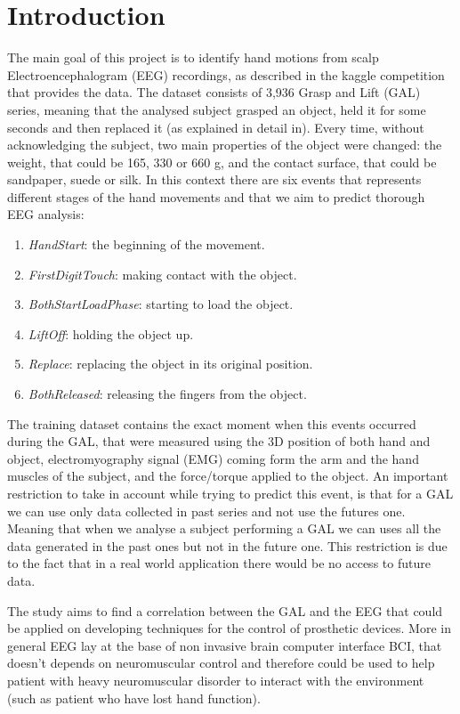 \documentclass[final,leqno,onefignum,onetabnum]{siamltexmm}
\begin{document}
  \section{Introduction}
  The main goal of this project is to identify hand motions from scalp Electroencephalogram (EEG) recordings, as described in the kaggle competition that provides the data\cite{kaggle}.  The dataset consists of 3,936 Grasp and Lift (GAL) series, meaning that the analysed subject grasped an object, held it for some seconds and then replaced it (as explained in detail in\cite{experiment}). Every time, without acknowledging the subject,  two main properties of the object were changed: the  weight, that could be 165, 330 or 660 g, and the contact surface, that could be sandpaper, suede or silk. In this context there are six events that represents different stages of the hand movements and that we aim to predict thorough EEG analysis: 
  \begin{enumerate} 
    \item \textit{HandStart}: the beginning of the movement.
    \item \textit{FirstDigitTouch}: making contact with the object.  
    \item \textit{BothStartLoadPhase}: starting to load the object. 
    \item \textit{LiftOff}: holding the object up.
    \item \textit{Replace}: replacing the object in its original position.
    \item \textit{BothReleased}: releasing the fingers from the object. 
  \end{enumerate}
  The training dataset contains the exact moment when this events occurred during the GAL, that were measured using the 3D position of both hand and object, electromyography signal (EMG) coming form the arm and the hand muscles of the subject, and the force/torque applied to the object. An important restriction to take in account while trying to predict this event, is that for a GAL we can use only data collected in past series and not use the futures one. Meaning that when we analyse a subject performing  a GAL we can uses all the data generated in the past ones but not in the future one. This restriction is due to the fact that in a real world application there would be no access to future data.


  The study aims to find a correlation between the GAL and the EEG  that could be applied on developing techniques for the control of prosthetic devices. More in general EEG lay at the base of non invasive brain computer interface BCI\cite{BCI}, that doesn't depends on neuromuscular control and therefore could be used to help patient with heavy neuromuscular disorder to interact with the environment (such as patient who have lost hand function). 
\end{document}
